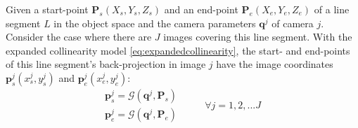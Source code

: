 Given a start-point $\mathbf{P}_s(X_s,Y_s,Z_s)$ and an end-point $\mathbf{P}_e(X_e,Y_e,Z_e)$ of a line segment $L$ in the object space and the camera parameters $\mathbf{q}^j$ of camera $j$. Consider the case where there are $J$ images covering this line segment. With the expanded collinearity model \eqref{eq:expandedcollinearity}, the start- and end-points of this line segment's back-projection in image $j$ have the image coordinates $\mathbf{p}^j_s(x^j_s,y^j_s)$ and $\mathbf{p}^j_e(x^j_e,y^j_e)$:
\begin{equation} \label{eq:obsmodel-collinearity}
\begin{split}
\mathbf{p}^j_s = \mathcal{G}(\mathbf{q}^j,\mathbf{P}_s)\\
\mathbf{p}^j_e = \mathcal{G}(\mathbf{q}^j,\mathbf{P}_e)
\end{split}
\qquad
\begin{split}
\forall j=1,2,...J
\end{split}
\end{equation}



